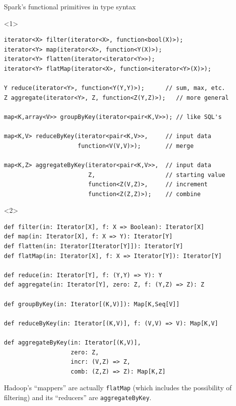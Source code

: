\documentclass{beamer}
\begin{document}
\begin{frame}[fragile]{Spark's functional primitives in  type syntax}
\small
\begin{onlyenv}<1>
\begin{verbatim}
iterator<X> filter(iterator<X>, function<bool(X)>);
iterator<Y> map(iterator<X>, function<Y(X)>);
iterator<Y> flatten(iterator<iterator<Y>>);
iterator<Y> flatMap(iterator<X>, function<iterator<Y>(X)>);

Y reduce(iterator<Y>, function<Y(Y,Y)>);      // sum, max, etc.
Z aggregate(iterator<Y>, Z, function<Z(Y,Z)>);   // more general

map<K,array<V>> groupByKey(iterator<pair<K,V>>); // like SQL's

map<K,V> reduceByKey(iterator<pair<K,V>>,     // input data
                     function<V(V,V)>);       // merge

map<K,Z> aggregateByKey(iterator<pair<K,V>>,  // input data
                        Z,                    // starting value
                        function<Z(V,Z)>,     // increment
                        function<Z(Z,Z)>);    // combine
\end{verbatim}
\end{onlyenv}
\begin{onlyenv}<2>
\begin{verbatim}
def filter(in: Iterator[X], f: X => Boolean): Iterator[X]
def map(in: Iterator[X], f: X => Y): Iterator[Y]
def flatten(in: Iterator[Iterator[Y]]): Iterator[Y]
def flatMap(in: Iterator[X], f: X => Iterator[Y]): Iterator[Y]

def reduce(in: Iterator[Y], f: (Y,Y) => Y): Y
def aggregate(in: Iterator[Y], zero: Z, f: (Y,Z) => Z): Z

def groupByKey(in: Iterator[(K,V)]): Map[K,Seq[V]]

def reduceByKey(in: Iterator[(K,V)], f: (V,V) => V): Map[K,V]

def aggregateByKey(in: Iterator[(K,V)],
                   zero: Z,
                   incr: (V,Z) => Z,
                   comb: (Z,Z) => Z): Map[K,Z]
\end{verbatim}
\end{onlyenv}

\normalsize
Hadoop's ``mappers'' are actually {\tt flatMap} (which includes the possibility of filtering) and its ``reducers'' are {\tt aggregateByKey}.
\end{frame}
\end{document}
